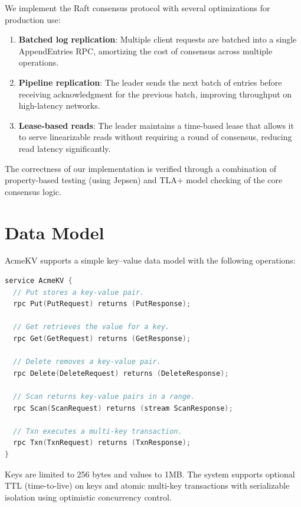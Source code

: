 \documentclass[12pt,a4paper]{report}
\begin{document}
We implement the Raft consensus protocol with several optimizations for production use:

\begin{enumerate}[itemsep=4pt]
  \item \textbf{Batched log replication}: Multiple client requests are batched into a single AppendEntries RPC, amortizing the cost of consensus across multiple operations.
  \item \textbf{Pipeline replication}: The leader sends the next batch of entries before receiving acknowledgment for the previous batch, improving throughput on high-latency networks.
  \item \textbf{Lease-based reads}: The leader maintains a time-based lease that allows it to serve linearizable reads without requiring a round of consensus, reducing read latency significantly.
\end{enumerate}

The correctness of our implementation is verified through a combination of property-based testing (using Jepsen) and TLA+ model checking of the core consensus logic.

\section{Data Model}

AcmeKV supports a simple key--value data model with the following operations:

\begin{lstlisting}[language=Go, caption={AcmeKV core API definition.}]
service AcmeKV {
  // Put stores a key-value pair.
  rpc Put(PutRequest) returns (PutResponse);

  // Get retrieves the value for a key.
  rpc Get(GetRequest) returns (GetResponse);

  // Delete removes a key-value pair.
  rpc Delete(DeleteRequest) returns (DeleteResponse);

  // Scan returns key-value pairs in a range.
  rpc Scan(ScanRequest) returns (stream ScanResponse);

  // Txn executes a multi-key transaction.
  rpc Txn(TxnRequest) returns (TxnResponse);
}
\end{lstlisting}

Keys are limited to 256 bytes and values to 1MB. The system supports optional TTL (time-to-live) on keys and atomic multi-key transactions with serializable isolation using optimistic concurrency control.
\end{document}
